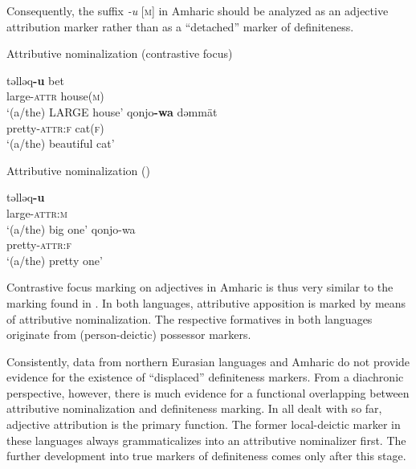 {Consequently, the suffix \textit{-u} [\textsc{m}] in Amharic should be analyzed as an adjective attribution marker rather than as a “detached” marker of definiteness. 
\begin{exe}
\ex	{}
\begin{xlist}
\ex	\rm{Attributive nominalization (contrastive focus)}
\begin{xlist}
\ex
\gll	təlləq\textbf{-u} bet\\
	large-\textsc{attr} house(\textsc{m})\\
\glt	‘(a/the) LARGE house’
\ex	
\gll	qonjo\textbf{-wa} dəmmät\\
	pretty-\textsc{attr:f} cat(\textsc{f})\\
\glt	‘(a/the) beautiful cat’
\end{xlist}
\ex	\rm{Attributive nominalization ()}
\begin{xlist}
\ex
\gll	təlləq\textbf{-u}\\
	large-\textsc{attr:m}\\
\glt	‘(a/the) big one’
\ex	
\gll	qonjo-wa\\
	pretty-\textsc{attr:f}\\
\glt	‘(a/the) pretty one’
\end{xlist}
\end{xlist}
\end{exe}
Contrastive focus marking on adjectives in Amharic is thus very similar to the marking found in . In both languages, attributive apposition is marked by means of attributive nominalization. The respective formatives in both languages originate from (person-deictic) possessor markers.

Consistently, data from northern Eurasian languages and Amharic do not provide evidence for the existence of “displaced” definiteness markers. From a diachronic perspective, however, there is much evidence for a functional overlapping between attributive nominalization and definiteness marking. In all  dealt with so far, adjective attribution is the primary function. The former local-deictic marker in these languages always grammaticalizes into an attributive nominalizer first. The further development into true markers of definiteness comes only after this stage.

}
